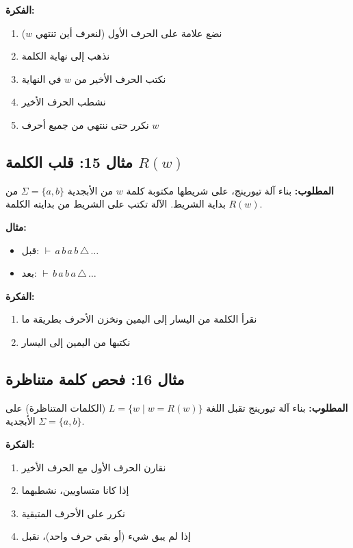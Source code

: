 \documentclass[14pt]{extarticle}
\begin{document}
\textbf{الفكرة:}
\begin{enumerate}
    \item نضع علامة على الحرف الأول (لنعرف أين تنتهي $w$)
    \item نذهب إلى نهاية الكلمة
    \item نكتب الحرف الأخير من $w$ في النهاية
    \item نشطب الحرف الأخير
    \item نكرر حتى ننتهي من جميع أحرف $w$
\end{enumerate}

\subsection{مثال 15: قلب الكلمة $R(w)$}

\textbf{المطلوب:} بناء آلة تيورينج، على شريطها مكتوبة كلمة $w$ من الأبجدية $\Sigma = \{a, b\}$ من بداية الشريط. الآلة تكتب على الشريط من بدايته الكلمة $R(w)$.

\textbf{مثال:}
\begin{itemize}
    \item قبل: $\vdash \, a \, b \, a \, b \, \triangle \, \ldots$
    \item بعد: $\vdash \, b \, a \, b \, a \, \triangle \, \ldots$
\end{itemize}

\textbf{الفكرة:}
\begin{enumerate}
    \item نقرأ الكلمة من اليسار إلى اليمين ونخزن الأحرف بطريقة ما
    \item نكتبها من اليمين إلى اليسار
\end{enumerate}

\subsection{مثال 16: فحص كلمة متناظرة}

\textbf{المطلوب:} بناء آلة تيورينج تقبل اللغة $L = \{w \mid w = R(w)\}$ (الكلمات المتناظرة) على الأبجدية $\Sigma = \{a, b\}$.

\textbf{الفكرة:}
\begin{enumerate}
    \item نقارن الحرف الأول مع الحرف الأخير
    \item إذا كانا متساويين، نشطبهما
    \item نكرر على الأحرف المتبقية
    \item إذا لم يبق شيء (أو بقي حرف واحد)، نقبل
\end{enumerate}
\end{document}
